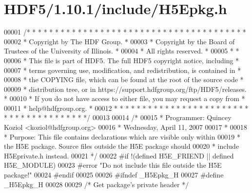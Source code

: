 \hypertarget{_h_d_f5_21_810_81_2include_2_h5_epkg_8h_source}{}\section{H\+D\+F5/1.10.1/include/\+H5\+Epkg.h}
\label{_h_d_f5_21_810_81_2include_2_h5_epkg_8h_source}

\begin{DoxyCode}
00001 \textcolor{comment}{/* * * * * * * * * * * * * * * * * * * * * * * * * * * * * * * * * * * * * * *}
00002 \textcolor{comment}{ * Copyright by The HDF Group.                                               *}
00003 \textcolor{comment}{ * Copyright by the Board of Trustees of the University of Illinois.         *}
00004 \textcolor{comment}{ * All rights reserved.                                                      *}
00005 \textcolor{comment}{ *                                                                           *}
00006 \textcolor{comment}{ * This file is part of HDF5.  The full HDF5 copyright notice, including     *}
00007 \textcolor{comment}{ * terms governing use, modification, and redistribution, is contained in    *}
00008 \textcolor{comment}{ * the COPYING file, which can be found at the root of the source code       *}
00009 \textcolor{comment}{ * distribution tree, or in https://support.hdfgroup.org/ftp/HDF5/releases.  *}
00010 \textcolor{comment}{ * If you do not have access to either file, you may request a copy from     *}
00011 \textcolor{comment}{ * help@hdfgroup.org.                                                        *}
00012 \textcolor{comment}{ * * * * * * * * * * * * * * * * * * * * * * * * * * * * * * * * * * * * * * */}
00013 
00014 \textcolor{comment}{/*}
00015 \textcolor{comment}{ * Programmer:  Quincey Koziol <koziol@hdfgroup.org>}
00016 \textcolor{comment}{ *      Wednesday, April 11, 2007}
00017 \textcolor{comment}{ *}
00018 \textcolor{comment}{ * Purpose: This file contains declarations which are visible only within}
00019 \textcolor{comment}{ *      the H5E package.  Source files outside the H5E package should}
00020 \textcolor{comment}{ *      include H5Eprivate.h instead.}
00021 \textcolor{comment}{ */}
00022 \textcolor{preprocessor}{#if !(defined H5E\_FRIEND || defined H5E\_MODULE)}
00023 \textcolor{preprocessor}{#error "Do not include this file outside the H5E package!"}
00024 \textcolor{preprocessor}{#endif}
00025 
00026 \textcolor{preprocessor}{#ifndef \_H5Epkg\_H}
00027 \textcolor{preprocessor}{#define \_H5Epkg\_H}
00028 
00029 \textcolor{comment}{/* Get package's private header */}

\end{DoxyCode}
